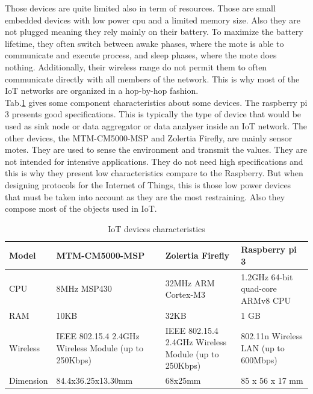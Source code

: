 Those devices are quite limited also in term of resources. Those are small embedded devices with low power cpu and a limited memory size. Also they are not plugged meaning they rely mainly on their battery. To maximize the battery lifetime, they often switch between awake phases, where the mote is able to communicate and execute process, and sleep phases, where the mote does nothing. Additionally, their wireless range do not permit them to often communicate directly with all members of the network. This is why most of the IoT networks are organized in a hop-by-hop fashion. \\

Tab.\ref{tab:sensors_char} gives some component characteristics about some devices. The raspberry pi 3 presents good specifications. This is typically the type of device that would be used as sink node or data aggregator or data analyser inside an IoT network. The other devices, the MTM-CM5000-MSP and Zolertia Firefly, are mainly sensor motes. They are used to sense the environment and transmit the values. They are not intended for intensive applications. They do not need high specifications and this is why they present low characteristics compare to the Raspberry. But when designing protocols for the Internet of Things, this is those low power devices that must be taken into account as they are the most restraining. Also they compose most of the objects used in IoT. \\

\begin{table}
  \centering
  \begin{tabularx}{\textwidth}{|X|X|X|X|}
    \hline
    Model & MTM-CM5000-MSP & Zolertia Firefly & Raspberry pi 3 \\ \hline
    CPU & 8MHz MSP430 & 32MHz ARM Cortex-M3 & 1.2GHz 64-bit quad-core ARMv8 CPU\\ \hline
    RAM & 10KB & 32KB & 1 GB \\ \hline
    Wireless & IEEE 802.15.4 2.4GHz Wireless Module (up to 250Kbps) & IEEE 802.15.4 2.4GHz Wireless Module (up to 250Kbps) & 802.11n Wireless LAN (up to 600Mbps)\\ \hline
    Dimension & 84.4x36.25x13.30mm & 68x25mm & 85 x 56 x 17 mm \\ \hline
  \end{tabularx}
  \caption{IoT devices characteristics}
  \label{tab:sensors_char}

\end{table}

